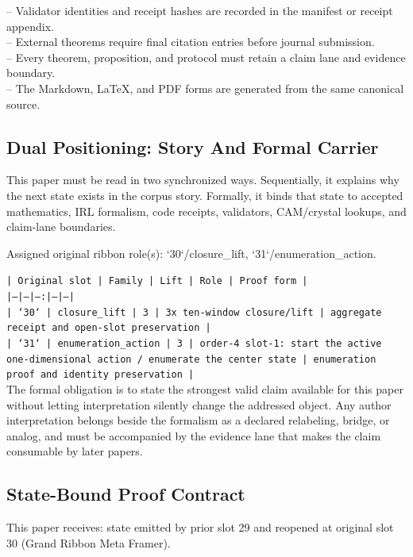 \documentclass[11pt]{article}
\begin{document}
\noindent{}-- Validator identities and receipt hashes are recorded in the manifest or receipt appendix.\\
\noindent{}-- External theorems require final citation entries before journal submission.\\
\noindent{}-- Every theorem, proposition, and protocol must retain a claim lane and evidence boundary.\\
\noindent{}-- The Markdown, LaTeX, and PDF forms are generated from the same canonical source.\\

\subsection*{Dual Positioning: Story And Formal Carrier}

This paper must be read in two synchronized ways. Sequentially, it explains why
the next state exists in the corpus story. Formally, it binds that state to
accepted mathematics, IRL formalism, code receipts, validators, CAM/crystal
lookups, and claim-lane boundaries.

Assigned original ribbon role(s): `30`/closure\_lift, `31`/enumeration\_action.

\noindent\texttt{| Original slot | Family | Lift | Role | Proof form |}\\
\noindent\texttt{|---|---|---:|---|---|}\\
\noindent\texttt{| `30` | closure\_lift | 3 | 3x ten-window closure/lift | aggregate receipt and open-slot preservation |}\\
\noindent\texttt{| `31` | enumeration\_action | 3 | order-4 slot-1: start the active one-dimensional action / enumerate the center state | enumeration proof and identity preservation |}\\

The formal obligation is to state the strongest valid claim available for this
paper without letting interpretation silently change the addressed object. Any
author interpretation belongs beside the formalism as a declared relabeling,
bridge, or analog, and must be accompanied by the evidence lane that makes the
claim consumable by later papers.

\subsection*{State-Bound Proof Contract}

This paper receives: state emitted by prior slot 29 and reopened at original slot 30 (Grand Ribbon Meta Framer).
\end{document}
